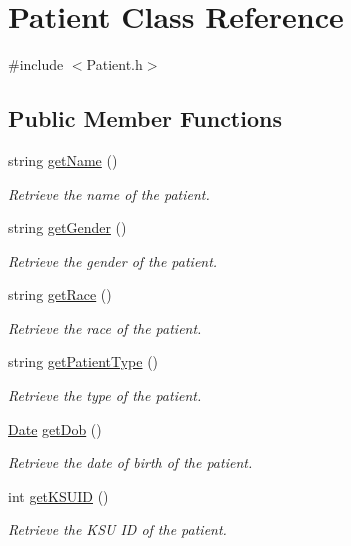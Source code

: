 \hypertarget{classPatient}{\section{Patient Class Reference}
\label{classPatient}
}


{\ttfamily \#include $<$Patient.\-h$>$}

\subsection*{Public Member Functions}
\begin{DoxyCompactItemize}
\item 
string \hyperlink{classPatient_a69910a374b455ce5c5f148a93279d9cf}{get\-Name} ()
\begin{DoxyCompactList}\small\item\em Retrieve the name of the patient. \end{DoxyCompactList}\item 
string \hyperlink{classPatient_a09f45cf60eb7d32b63e4002f6215c57f}{get\-Gender} ()
\begin{DoxyCompactList}\small\item\em Retrieve the gender of the patient. \end{DoxyCompactList}\item 
string \hyperlink{classPatient_a6a7acd37be18d10dc278e9a73be88a82}{get\-Race} ()
\begin{DoxyCompactList}\small\item\em Retrieve the race of the patient. \end{DoxyCompactList}\item 
string \hyperlink{classPatient_a74ff6cd63c820abe325b6255723074f0}{get\-Patient\-Type} ()
\begin{DoxyCompactList}\small\item\em Retrieve the type of the patient. \end{DoxyCompactList}\item 
\hyperlink{structDate}{Date} \hyperlink{classPatient_a1ef2aa700d64adfc6dae6e32b2f2325c}{get\-Dob} ()
\begin{DoxyCompactList}\small\item\em Retrieve the date of birth of the patient. \end{DoxyCompactList}\item 
int \hyperlink{classPatient_a86847067f9dfc59e5a86229a5a9e6ea8}{get\-K\-S\-U\-I\-D} ()
\begin{DoxyCompactList}\small\item\em Retrieve the K\-S\-U I\-D of the patient. \end{DoxyCompactList}\item 

\end{DoxyCompactItemize}
